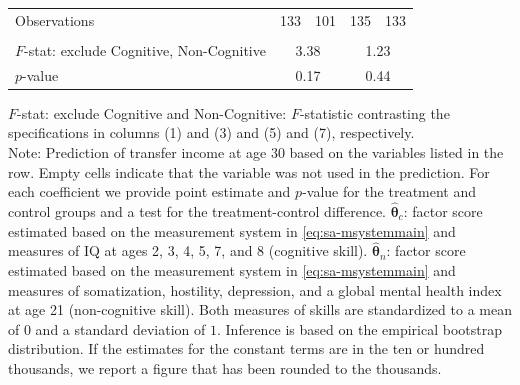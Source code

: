 \documentclass[static]{JJH-Beamer}
\begin{document}
\begin{frame}
\begin{table}[H]
\begin{center}
{\begin{tabular}{lcccccccc}
Observations &       \multicolumn{2}{c}{133} &           \multicolumn{2}{c}{101} &         \multicolumn{2}{c}{135} &            \multicolumn{2}{c}{133}  \\  \\ \midrule
$F$-stat: exclude Cognitive, Non-Cognitive &              \multicolumn{4}{c}{3.38} &             \multicolumn{4}{c}{1.23}  \\
$p$-value &            \multicolumn{4}{c}{0.17} &               \multicolumn{4}{c}{0.44}  \\
\bottomrule
\end{tabular}
}
\end{center}
\tiny \flushleft
$F$-stat: exclude Cognitive and Non-Cognitive: $F$-statistic contrasting the specifications in columns (1) and (3) and (5) and (7), respectively.\\
Note: Prediction of transfer income at age 30 based on the variables listed in the row. Empty cells indicate that the variable was not used in the prediction. For each coefficient we provide point estimate and $p$-value for the treatment and control groups and a test for the treatment-control difference. $\hat{\bm{\theta}}_{c}$: factor score estimated based on the measurement system in \eqref{eq:sa-msystemmain} and measures of IQ at ages 2, 3, 4, 5, 7, and 8 (cognitive skill). $\hat{\bm{\theta}}_{n}$: factor score estimated based on the measurement system in \eqref{eq:sa-msystemmain} and measures of somatization, hostility, depression, and a global mental health index at age 21 (non-cognitive skill). Both measures of skills are standardized to a mean of $0$ and a standard deviation of $1$. Inference is based on the empirical bootstrap distribution. If the estimates for the constant terms are in the ten or hundred thousands, we report a figure that has been rounded to the thousands.\\
\end{table}

\end{frame}
\end{document}
